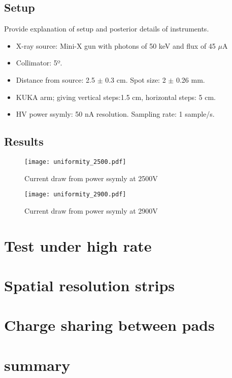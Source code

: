 \subsection{Setup}
Provide explanation of setup and posterior details of instruments.\\

\begin{itemize}
\item X-ray source: Mini-X gun with photons of  50 keV and flux of  45 $\mu$A
\item Collimator: 5º.
\item Distance from source: 2.5 $\pm$ 0.3 cm. Spot size: 2 $\pm$ 0.26 mm.
\item KUKA arm; giving vertical steps:1.5 cm, horizontal steps: 5 cm.
\item HV power ssymly: 50 nA resolution. Sampling rate: 1 sample/s.
\end{itemize}


\subsection{Results}

\begin{figure}[ht]
	\centering
	\texttt{[image: uniformity\_2500.pdf]}
	\caption{Current draw from power ssymly at 2500V}\label{fig:2500V}
\end{figure}

\begin{figure}[hb]
	\centering
	\texttt{[image: uniformity\_2900.pdf]}
	\caption{Current draw from power ssymly at 2900V}\label{fig:2900V}
\end{figure}


\section{Test under high rate}


\section{Spatial resolution strips}

\section{Charge sharing between pads}

\section{summary}
